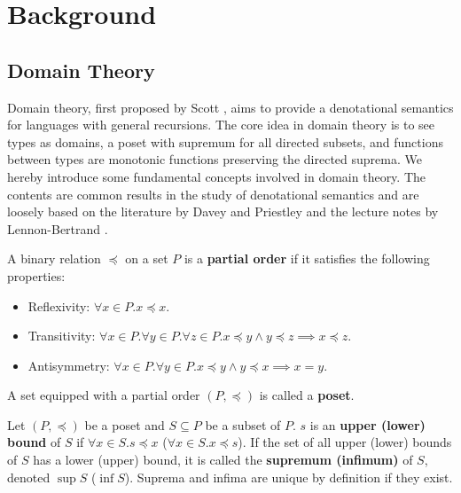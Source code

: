 
\chapter{Background}

\section{Domain Theory}

Domain theory, first proposed by Scott \cite{scott_domains_1982,scott_outline_1970}, aims to provide a denotational semantics for languages with general recursions. The core idea in domain theory is to see types as domains, a poset with supremum for all directed subsets, and functions between types are monotonic functions preserving the directed suprema. We hereby introduce some fundamental concepts involved in domain theory. The contents are common results in the study of denotational semantics and are loosely based on the literature by Davey and Priestley \cite{davey_introduction_2002} and the lecture notes by Lennon-Bertrand \cite{lennon-bertrand_denotational_2024}.

\begin{definition}
    A binary relation $\preceq$ on a set $P$ is a \textbf{partial order} if it satisfies the following properties:
    \begin{itemize}
        \item Reflexivity: $\forall x\in P.x\preceq x$.
        \item Transitivity: $\forall x\in P.\forall y\in P.\forall z\in P.x\preceq y\wedge y\preceq z\implies x\preceq z$.
        \item Antisymmetry: $\forall x\in P.\forall y\in P.x\preceq y\wedge y\preceq x\implies x=y$.
    \end{itemize}
    A set equipped with a partial order $(P,\preceq)$ is called a \textbf{poset}.
\end{definition}

\begin{definition}
    Let $(P,\preceq)$ be a poset and $S\subseteq P$ be a subset of $P$. $s$ is an \textbf{upper (lower) bound} of $S$ if $\forall x\in S.s\preceq x$ ($\forall x\in S.x\preceq s$). If the set of all upper (lower) bounds of $S$ has a lower (upper) bound, it is called the \textbf{supremum (infimum)} of $S$, denoted $\sup S$ ($\inf S$). Suprema and infima are unique by definition if they exist.
\end{definition}

